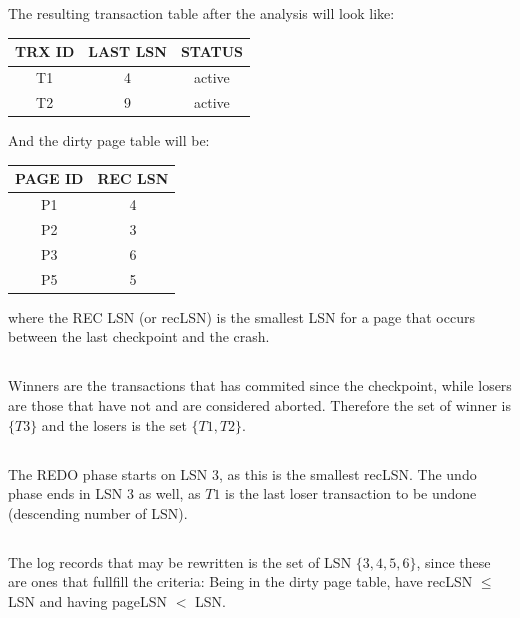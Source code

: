 \documentclass[a4paper]{article}
\begin{document}
\subsection{}
The resulting transaction table after the analysis will look like:
\begin{center}
\begin{tabular}{c|c|c}
  TRX ID & LAST LSN & STATUS \\
  \hline
  T1 & 4 & active \\
  \hline
  T2 & 9 & active \\
\end{tabular}
\end{center}
And the dirty page table will be:
\begin{center}
\begin{tabular}{c|c}
  PAGE ID & REC LSN \\
  \hline
  P1 & 4 \\
  \hline
  P2 & 3 \\
  \hline
  P3 & 6 \\
  \hline
  P5 & 5
\end{tabular}
\end{center}
where the REC LSN (or recLSN) is the smallest LSN for a page that occurs between the last checkpoint and the crash.

\subsection{}
Winners are the transactions that has commited since the checkpoint, while losers are those that have not and are considered aborted. Therefore the set of winner is $\{T3\}$ and the losers is the set $\{T1, T2\}$.

\subsection{}
The REDO phase starts on LSN $3$, as this is the smallest recLSN. The undo phase ends in LSN $3$ as well, as $T1$ is the last loser transaction to be undone (descending number of LSN).

\subsection{}
The log records that may be rewritten is the set of LSN $\{3, 4, 5, 6\}$, since these are ones that fullfill the criteria: Being in the dirty page table, have recLSN $\leq$ LSN and having pageLSN $<$ LSN.
\end{document}
